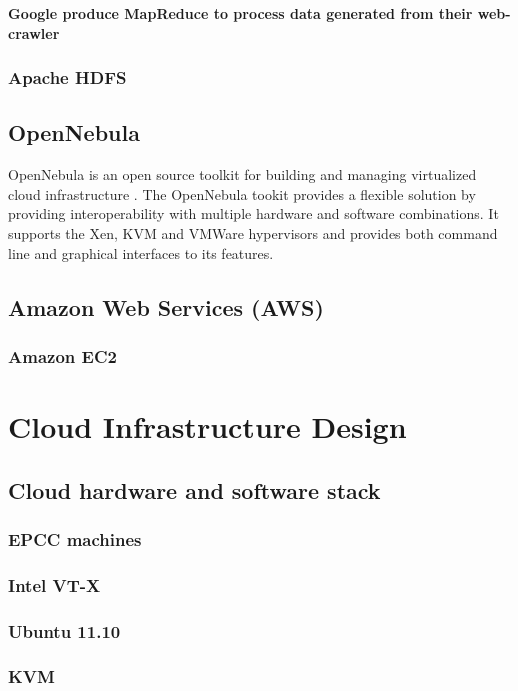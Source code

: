 \documentclass[12pt,a4paper]{report}
\begin{document}
{\bf Google produce MapReduce to process data generated from their web-crawler}

\subsection{Apache HDFS}

\section{OpenNebula}

OpenNebula is an open source toolkit for building and managing virtualized
cloud infrastructure \cite{website:one}. The OpenNebula tookit provides a flexible
solution by providing interoperability with multiple hardware and software combinations.
It supports the Xen, KVM and VMWare hypervisors and provides both command line
and graphical interfaces to its features.


\section{Amazon Web Services (AWS)}

\subsection{Amazon EC2}

\chapter{Cloud Infrastructure Design}

\section{Cloud hardware and software stack}
\subsection{EPCC machines}
\subsection{Intel VT-X}
\subsection{Ubuntu 11.10}
\subsection{KVM}
\end{document}
